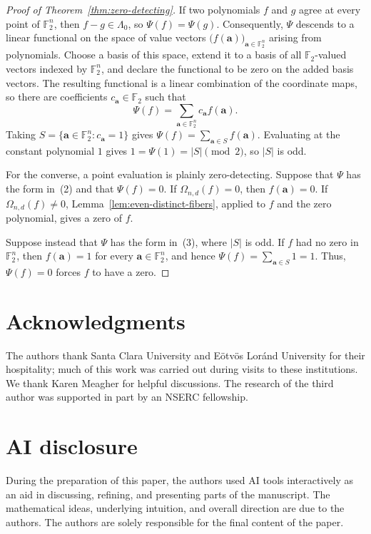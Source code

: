 \documentclass[12pt,reqno]{amsart}
\theoremstyle{definition}
\newcommand{\F}{\mathbb{F}}
\begin{document}
\begin{proof}[Proof of Theorem~\ref{thm:zero-detecting}]
If two polynomials $f$ and $g$ agree at every point of $\F_2^n$, then $f-g\in \Lambda_{0}$, so $\Psi(f)=\Psi(g)$. Consequently, $\Psi$ descends to a linear functional on the space of value vectors $\bigl(f(\mathbf a)\bigr)_{\mathbf a\in\F_2^n}$ arising from polynomials. Choose a basis of this space, extend it to a basis of all $\F_2$-valued vectors indexed by $\F_2^n$, and declare the functional to be zero on the added basis vectors. The resulting functional is a linear combination of the coordinate maps, so there are coefficients $c_{\mathbf a}\in\F_2$ such that
\[
\Psi(f)=\sum_{\mathbf a\in\F_2^n}c_{\mathbf a}f(\mathbf a).
\]
Taking $S=\{\mathbf a\in\F_2^n:c_{\mathbf a}=1\}$ gives $\Psi(f)=\sum_{\mathbf a\in S}f(\mathbf a)$.  Evaluating at the constant polynomial $1$ gives $1=\Psi(1)=|S|\pmod2$, so $|S|$ is odd.

\smallskip

For the converse, a point evaluation is plainly zero-detecting. Suppose that $\Psi$ has the form in~{\rm(2)} and that $\Psi(f)=0$. If $\Omega_{n,d}(f)=0$, then $f(\mathbf a)=0$. If $\Omega_{n,d}(f)\neq0$, Lemma~\ref{lem:even-distinct-fibers}, applied to
$f$ and the zero polynomial, gives a zero of $f$.

Suppose instead that $\Psi$ has the form in~{\rm(3)}, where $|S|$ is odd. If $f$ had no zero in $\F_2^n$, then $f(\mathbf a)=1$ for every $\mathbf a\in\F_2^n$, and hence $\Psi(f)=\sum_{\mathbf a\in S}1=1$. Thus, $\Psi(f)=0$ forces $f$ to have a zero.
\end{proof}

\section*{Acknowledgments}
The authors thank Santa Clara University and E\"otv\"os Lor\'and University for their hospitality; much of this work was carried out during visits to these institutions. We thank Karen Meagher for helpful discussions. The research of the third author was supported in
part by an NSERC fellowship. 

\section*{AI disclosure}

During the preparation of this paper, the authors used AI tools interactively as an aid in discussing, refining, and presenting parts of the manuscript. The mathematical ideas, underlying intuition, and overall direction are due to the authors. The authors are solely responsible for the final content of the paper.





\end{document}
